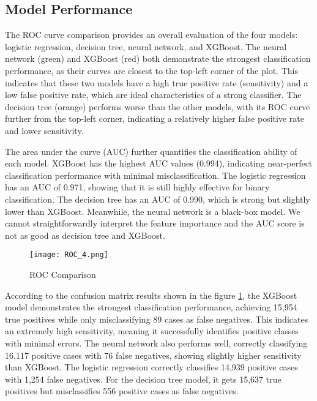 \documentclass[10pt,letterpaper]{article}
\begin{document}
\subsection{Model Performance}

The ROC curve comparison provides an overall evaluation of the four models: logistic regression, decision tree, neural network, and XGBoost. The neural network (green) and XGBoost (red) both demonstrate the strongest classification performance, as their curves are closest to the top-left corner of the plot. This indicates that these two models have a high true positive rate (sensitivity) and a low false positive rate, which are ideal characteristics of a strong classifier. The decision tree (orange) performs worse than the other models, with its ROC curve further from the top-left corner, indicating a relatively higher false positive rate and lower sensitivity.

The area under the curve (AUC) further quantifies the classification ability of each model. XGBoost has the highest AUC values (0.994), indicating near-perfect classification performance with minimal misclassification. The logistic regression has an AUC of 0.971, showing that it is still highly effective for binary classification. The decision tree has an AUC of 0.990, which is strong but slightly lower than XGBoost. Meanwhile, the neural network is a black-box model. We cannot straightforwardly interpret the feature importance and the AUC score is not as good as decision tree and XGBoost.

\begin{figure}[htbp]
    \centering
    \texttt{[image: ROC\_4.png]}
    \caption{ROC Comparison}
    \label{fig:ROC Coparison}
\end{figure}

According to the confusion matrix results shown in the figure \ref{fig:ROC Coparison}, the XGBoost model demonstrates the strongest classification performance, achieving 15,954 true positives while only misclassifying 89 cases as false negatives. This indicates an extremely high sensitivity, meaning it successfully identifies positive classes with minimal errors. The neural network also performs well, correctly classifying 16,117 positive cases with 76 false negatives, showing slightly higher sensitivity than XGBoost. The logistic regression correctly classifies 14,939 positive cases with 1,254 false negatives. For the decision tree model, it gets 15,637 true positives but misclassifies 556 positive cases as false negatives.
\end{document}
